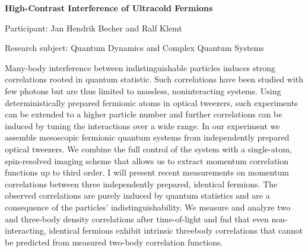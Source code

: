 \hfill 

\hfill 

\begin{minipage}[t]{1.0\textwidth}

\begin{center}

{{\large\bfseries High-Contrast Interference of Ultracold Fermions}\par}

\end{center}

{\noindent Participant: Jan Hendrik Becher and Ralf Klemt\par} 

{\noindent Research subject: Quantum Dynamics and Complex Quantum Systems\par}\medskip

\noindent Many-body interference between indistinguishable particles induces
strong correlations rooted in quantum statistic. Such correlations have
been studied with few photons but are thus limited to massless, noninteracting systems. Using deterministically prepared fermionic atoms
in optical tweezers, such experiments can be extended to a higher particle number and further correlations can be induced by tuning the
interactions over a wide range.
In our experiment we assemble mesoscopic fermionic quantum systems from independently prepared optical tweezers. We combine the
full control of the system with a single-atom, spin-resolved imaging
scheme that allows us to extract momentum correlation functions up
to third order.
I will present recent measurements on momentum correlations between three independently prepared, identical fermions. The observed
correlations are purely induced by quantum statistics and are a consequence of the particles’ indistinguishability. We measure and analyze
two and three-body density correlations after time-of-light and fnd
that even non-interacting, identical fermions exhibit intrinsic threebody correlations that cannot be predicted from measured two-body
correlation functions.\par\end{minipage}

\hfill 


